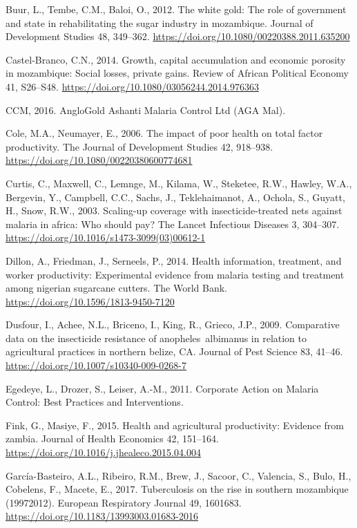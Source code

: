 \documentclass[]{article}
\begin{document}
\hypertarget{ref-Buur2012}{}
Buur, L., Tembe, C.M., Baloi, O., 2012. The white gold: The role of
government and state in rehabilitating the sugar industry in mozambique.
Journal of Development Studies 48, 349--362.
\url{https://doi.org/10.1080/00220388.2011.635200}

\hypertarget{ref-CastelBranco2014}{}
Castel-Branco, C.N., 2014. Growth, capital accumulation and economic
porosity in mozambique: Social losses, private gains. Review of African
Political Economy 41, S26--S48.
\url{https://doi.org/10.1080/03056244.2014.976363}

\hypertarget{ref-anglo}{}
CCM, 2016. AngloGold Ashanti Malaria Control Ltd (AGA Mal).

\hypertarget{ref-Cole2006}{}
Cole, M.A., Neumayer, E., 2006. The impact of poor health on total
factor productivity. The Journal of Development Studies 42, 918--938.
\url{https://doi.org/10.1080/00220380600774681}

\hypertarget{ref-Curtis2003}{}
Curtis, C., Maxwell, C., Lemnge, M., Kilama, W., Steketee, R.W., Hawley,
W.A., Bergevin, Y., Campbell, C.C., Sachs, J., Teklehaimanot, A.,
Ochola, S., Guyatt, H., Snow, R.W., 2003. Scaling-up coverage with
insecticide-treated nets against malaria in africa: Who should pay? The
Lancet Infectious Diseases 3, 304--307.
\url{https://doi.org/10.1016/s1473-3099(03)00612-1}

\hypertarget{ref-Dillon2014}{}
Dillon, A., Friedman, J., Serneels, P., 2014. Health information,
treatment, and worker productivity: Experimental evidence from malaria
testing and treatment among nigerian sugarcane cutters. The World Bank.
\url{https://doi.org/10.1596/1813-9450-7120}

\hypertarget{ref-Dusfour2009}{}
Dusfour, I., Achee, N.L., Briceno, I., King, R., Grieco, J.P., 2009.
Comparative data on the insecticide resistance of anopheles~albimanus in
relation to agricultural practices in northern belize, CA. Journal of
Pest Science 83, 41--46. \url{https://doi.org/10.1007/s10340-009-0268-7}

\hypertarget{ref-lafarge}{}
Egedeye, L., Drozer, S., Leiser, A.-M., 2011. Corporate Action on
Malaria Control: Best Practices and Interventions.

\hypertarget{ref-Fink2015}{}
Fink, G., Masiye, F., 2015. Health and agricultural productivity:
Evidence from zambia. Journal of Health Economics 42, 151--164.
\url{https://doi.org/10.1016/j.jhealeco.2015.04.004}

\hypertarget{ref-GarcaBasteiro2017}{}
García-Basteiro, A.L., Ribeiro, R.M., Brew, J., Sacoor, C., Valencia,
S., Bulo, H., Cobelens, F., Macete, E., 2017. Tuberculosis on the rise
in southern mozambique (19972012). European Respiratory Journal 49,
1601683. \url{https://doi.org/10.1183/13993003.01683-2016}
\end{document}
